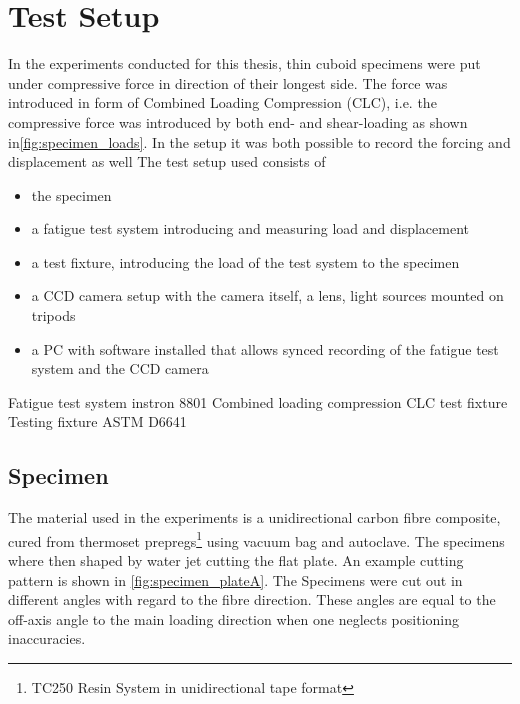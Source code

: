 \chapter{Test Setup}
\label{chap:\currfilebase}

In the experiments conducted for this thesis, thin cuboid specimens were put under compressive force in direction of their longest side. The force was introduced in form of Combined Loading Compression (CLC), i.e. the compressive force was introduced by both end- and shear-loading as shown in\autoref{fig:specimen_loads}. In the setup it was both possible to record the forcing and displacement as well 
The test setup used consists of
\begin{itemize}
    \item the specimen
    \item a fatigue test system introducing and measuring load and displacement
    \item a test fixture, introducing the load of the test system to the specimen
    \item a CCD camera setup with the camera itself, a lens, light sources mounted on tripods
    \item a PC with software installed that allows synced recording of the fatigue test system and the CCD camera
\end{itemize}
Fatigue test system instron 8801
Combined loading compression CLC test fixture
Testing fixture ASTM D6641

\section{Specimen}
\label{sec:specimen}

The material used in the experiments is a unidirectional carbon fibre composite, cured from thermoset prepregs\footnote{TC250 Resin System in unidirectional tape format} using vacuum bag and autoclave. The specimens where then shaped by water jet cutting the flat plate. An example cutting pattern is shown in \autoref{fig:specimen_plateA}.
The Specimens were cut out in different angles with regard to the fibre direction. These angles are equal to the off-axis angle to the main loading direction when one neglects positioning inaccuracies.

